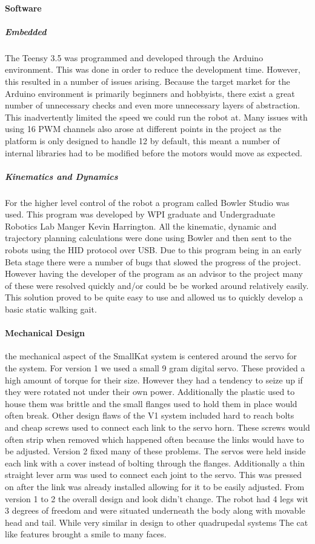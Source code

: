         \paragraph{Software}
            \subparagraph*{Embedded}
            The Teensy 3.5 was programmed and developed through the Arduino environment. This was done in order to reduce the development time. However, this resulted in a number of issues arising. Because the target market for the Arduino environment is primarily beginners and hobbyists, there exist a great number of unnecessary checks and even more unnecessary layers of abstraction. This inadvertently limited the speed we could run the robot at. Many issues with using 16 PWM channels also arose at different points in the project as the platform is only designed to handle 12 by default, this meant a number of internal libraries had to be modified before the motors would move as expected. 
            \subparagraph*{Kinematics and Dynamics}
            For the higher level control of the robot a program called Bowler Studio was used. This program was developed by WPI graduate and Undergraduate Robotics Lab Manger Kevin Harrington. All the kinematic, dynamic and trajectory planning calculations were done using Bowler and then sent to the robots using the HID protocol over USB. Due to this program being in an early Beta stage there were a number of bugs that slowed the progress of the project. However having the developer of the program as an advisor to the project many of these were resolved quickly and/or could be be worked around relatively easily. This solution proved to be quite easy to use and allowed us to quickly develop a basic static walking gait. 
        \paragraph{Mechanical Design}
        the mechanical aspect of the SmallKat system is centered around the servo for the system. For version 1 we used a small 9 gram digital servo. These provided a high amount of torque for their size. However they had a tendency to seize up if they were rotated not under their own power. Additionally the plastic used to house them was brittle and the small flanges used to hold them in place would often break. Other design flaws of the V1 system included hard to reach bolts and cheap screws used to connect each link to the servo horn. These screws would often strip when removed which happened often because the links would have to be adjusted. Version 2 fixed many of these problems. The servos were held inside each link with a cover instead of bolting through the flanges. Additionally a thin straight lever arm was used to connect each joint to the servo. This was pressed on after the link was already installed allowing for it to be easily adjusted. From version 1 to 2 the overall design and look didn't change. The robot had 4 legs wit 3 degrees of freedom and were situated underneath the body along with movable head and tail. While very similar in design to other quadrupedal systems The cat like features brought a smile to many faces.
